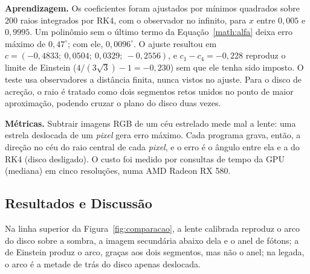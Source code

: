 \documentclass[a4paper, 12pt, twoside]{article}
\begin{document}
\textbf{Aprendizagem.} Os coeficientes foram ajustados por mínimos
quadrados sobre 200 raios integrados por RK4, com o observador no
infinito, para $x$ entre $0{,}005$ e $0{,}9995$. Um polinômio sem o
último termo da Equação~\ref{math:alfa} deixa erro máximo de
$0{,}47^\circ$; com ele, $0{,}0096^\circ$. O ajuste resultou em
$c = (-0{,}4833;\ 0{,}0504;\ 0{,}0329;\ -0{,}2556)$, e
$c_1 - c_4 = -0{,}228$ reproduz o limite de Einstein
($4/(3\sqrt{3}) - 1 = -0{,}230$) sem que ele tenha sido imposto. O teste
usa observadores a distância finita, nunca vistos no ajuste. Para o disco
de acreção, o raio é tratado como dois segmentos retos unidos no ponto de
maior aproximação, podendo cruzar o plano do disco duas vezes.

\textbf{Métricas.} Subtrair imagens RGB de um céu estrelado mede mal a
lente: uma estrela deslocada de um \emph{pixel} gera erro máximo. Cada
programa grava, então, a direção no céu do raio central de cada
\emph{pixel}, e o erro é o ângulo entre ela e a do RK4 (disco
desligado). O custo foi medido por consultas de tempo da GPU (mediana)
em cinco resoluções, numa AMD Radeon RX 580.

\subsection{Resultados e Discussão}

Na linha superior da Figura~\ref{fig:comparacao}, a lente calibrada
reproduz o arco do disco sobre a sombra, a imagem secundária abaixo dela
e o anel de fótons; a de Einstein produz o arco, graças aos dois
segmentos, mas não o anel; na legada, o arco é a metade de trás do disco
apenas deslocada.
\end{document}

